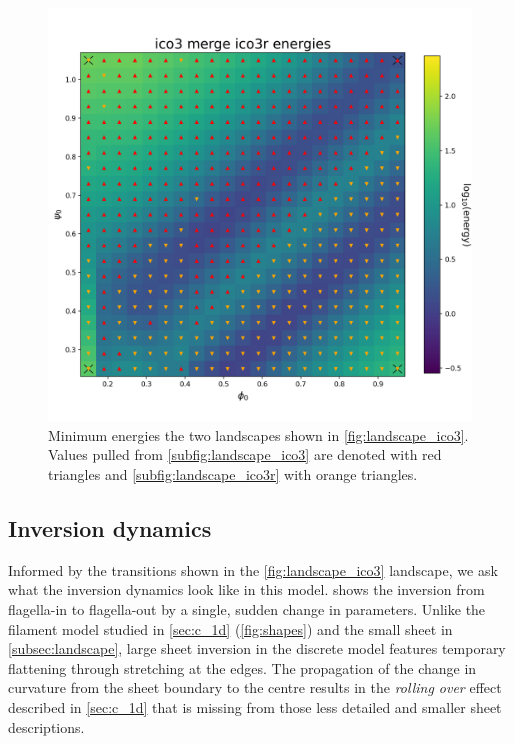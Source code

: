 \begin{figure}[ptbh]
	\centering
	\includegraphics[width=\textwidth]{landscape_merge.png}
	\caption[Combined energy landscape of \cref{fig:landscape_ico3}]{Minimum energies the two landscapes shown in \cref{fig:landscape_ico3}. Values pulled from \cref{subfig:landscape_ico3} are denoted with red triangles and \cref{subfig:landscape_ico3r} with orange triangles.}
	\label{fig:landscape_merge}
\end{figure}

\subsection{Inversion dynamics} \label{subsec:dynamics}

Informed by the transitions shown in the \cref{fig:landscape_ico3} landscape, we ask what the inversion dynamics look like in this model.
 shows the inversion from flagella-in to flagella-out by a single, sudden change in parameters.
Unlike the filament model studied in \cref{sec:c_1d} (\cref{fig:shapes}) and the small sheet in \cref{subsec:landscape}, large sheet inversion in the discrete model features temporary flattening through stretching at the edges.
The propagation of the change in curvature from the sheet boundary to the centre results in the \textit{rolling over} effect described in \cref{sec:c_1d} that is missing from those less detailed and smaller sheet descriptions. 

